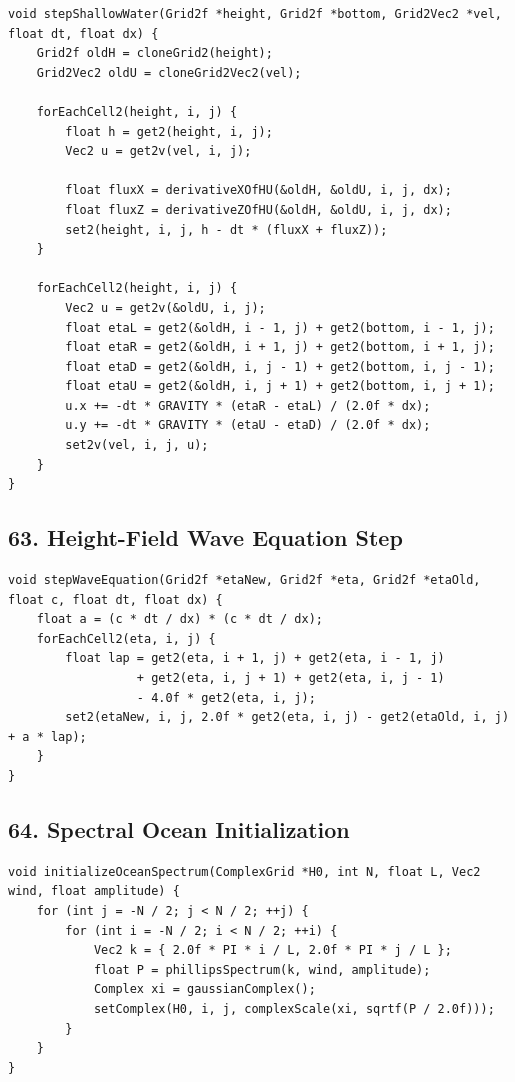 \documentclass[10pt,letterpaper]{article}
\begin{document}
\begin{verbatim}
void stepShallowWater(Grid2f *height, Grid2f *bottom, Grid2Vec2 *vel, float dt, float dx) {
    Grid2f oldH = cloneGrid2(height);
    Grid2Vec2 oldU = cloneGrid2Vec2(vel);

    forEachCell2(height, i, j) {
        float h = get2(height, i, j);
        Vec2 u = get2v(vel, i, j);

        float fluxX = derivativeXOfHU(&oldH, &oldU, i, j, dx);
        float fluxZ = derivativeZOfHU(&oldH, &oldU, i, j, dx);
        set2(height, i, j, h - dt * (fluxX + fluxZ));
    }

    forEachCell2(height, i, j) {
        Vec2 u = get2v(&oldU, i, j);
        float etaL = get2(&oldH, i - 1, j) + get2(bottom, i - 1, j);
        float etaR = get2(&oldH, i + 1, j) + get2(bottom, i + 1, j);
        float etaD = get2(&oldH, i, j - 1) + get2(bottom, i, j - 1);
        float etaU = get2(&oldH, i, j + 1) + get2(bottom, i, j + 1);
        u.x += -dt * GRAVITY * (etaR - etaL) / (2.0f * dx);
        u.y += -dt * GRAVITY * (etaU - etaD) / (2.0f * dx);
        set2v(vel, i, j, u);
    }
}
\end{verbatim}

\subsection*{63. Height-Field Wave Equation Step}

\begin{verbatim}
void stepWaveEquation(Grid2f *etaNew, Grid2f *eta, Grid2f *etaOld, float c, float dt, float dx) {
    float a = (c * dt / dx) * (c * dt / dx);
    forEachCell2(eta, i, j) {
        float lap = get2(eta, i + 1, j) + get2(eta, i - 1, j)
                  + get2(eta, i, j + 1) + get2(eta, i, j - 1)
                  - 4.0f * get2(eta, i, j);
        set2(etaNew, i, j, 2.0f * get2(eta, i, j) - get2(etaOld, i, j) + a * lap);
    }
}
\end{verbatim}

\subsection*{64. Spectral Ocean Initialization}

\begin{verbatim}
void initializeOceanSpectrum(ComplexGrid *H0, int N, float L, Vec2 wind, float amplitude) {
    for (int j = -N / 2; j < N / 2; ++j) {
        for (int i = -N / 2; i < N / 2; ++i) {
            Vec2 k = { 2.0f * PI * i / L, 2.0f * PI * j / L };
            float P = phillipsSpectrum(k, wind, amplitude);
            Complex xi = gaussianComplex();
            setComplex(H0, i, j, complexScale(xi, sqrtf(P / 2.0f)));
        }
    }
}
\end{verbatim}
\end{document}
